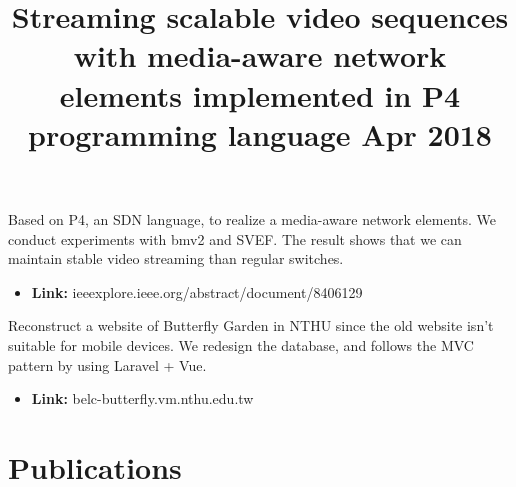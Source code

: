 \documentclass[margin]{res}
\begin{document}
\begin{resume}
\location{}
\title{\textbf{Streaming scalable video sequences with media-aware network elements implemented in P4 programming language \hfill Apr 2018}
 }
Based on P4, an SDN language, to realize a media-aware network elements. We conduct experiments with bmv2 and SVEF. The result shows that we can maintain stable video streaming than regular switches.
\begin{itemize}
\item \textbf{Link:} ieeexplore.ieee.org/abstract/document/8406129
\end{itemize}

Reconstruct a website of Butterfly Garden in NTHU since the old website isn't suitable for mobile devices. We redesign the database, and follows the MVC pattern by using Laravel + Vue.
\begin{itemize}
    \item \textbf{Link:} belc-butterfly.vm.nthu.edu.tw
\end{itemize}

\section{Publications}
\par
\normalfont{}






\end{resume}
\(\)
\end{document}
